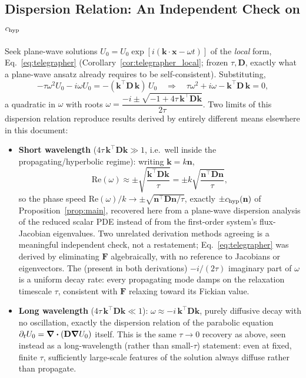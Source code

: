 \documentclass[11pt, a4paper, parskip]{scrartcl}
\theoremstyle{plain}
\theoremstyle{definition}
\theoremstyle{remark}
\newcommand{\Fdiff}{\mathbf{F}}                           %
\newcommand{\nunit}{\mathbf{n}}                           %
\newcommand{\chyp}{c_{\rm hyp}}                           %
\newcommand{\taurelax}{\tau}                              %
\newcommand{\Deff}{\mathbf{D}}                            %
\begin{document}
\subsection{Dispersion Relation: An Independent Check on $\chyp$}
Seek plane-wave solutions $U_0=\hat U_0\exp[i(\mathbf k\cdot\mathbf x-\omega t)]$
of the \emph{local} form, Eq.~\eqref{eq:telegrapher}
(Corollary~\ref{cor:telegrapher_local}; frozen $\taurelax,\Deff$, exactly
what a plane-wave ansatz already requires to be self-consistent).
Substituting,
\begin{equation}
  -\taurelax\omega^2 U_0 - i\omega U_0 = -(\mathbf k^{\!\top}\Deff\,\mathbf k)\,U_0
  \quad\Longrightarrow\quad
  \taurelax\omega^2 + i\omega - \mathbf k^{\!\top}\Deff\,\mathbf k = 0 ,
\end{equation}
a quadratic in $\omega$ with roots
$\omega = \dfrac{-i \pm \sqrt{-1+4\taurelax\,\mathbf k^{\!\top}\Deff\mathbf k}}{2\taurelax}$.
Two limits of this dispersion relation reproduce results derived by
entirely different means elsewhere in this document:
\begin{itemize}
\item \textbf{Short wavelength} ($4\taurelax\,\mathbf k^{\!\top}\Deff\mathbf k\gg1$,
  i.e.\ well inside the propagating/hyperbolic regime): writing
  $\mathbf k=k\nunit$,
  \begin{equation}
    \mathrm{Re}(\omega) \approx \pm\sqrt{\frac{\mathbf k^{\!\top}\Deff\mathbf k}{\taurelax}}
    = \pm k\sqrt{\frac{\nunit^{\!\top}\Deff\nunit}{\taurelax}} ,
  \end{equation}
  so the phase speed $\mathrm{Re}(\omega)/k \to \pm\sqrt{\nunit^{\!\top}\Deff\nunit/\taurelax}$,
  exactly $\pm\chyp(\nunit)$ of Proposition~\ref{prop:main}, recovered
  here from a plane-wave dispersion analysis of the reduced scalar PDE
  instead of from the first-order system's flux-Jacobian eigenvalues. Two
  unrelated derivation methods agreeing is a meaningful independent check,
  not a restatement; Eq.~\eqref{eq:telegrapher} was derived by
  eliminating $\Fdiff$ algebraically, with no reference to Jacobians or
  eigenvectors. The (present in both derivations) $-i/(2\taurelax)$
  imaginary part of $\omega$ is a uniform decay rate: every propagating
  mode damps on the relaxation timescale $\taurelax$, consistent with
  $\Fdiff$ relaxing toward its Fickian value.
\item \textbf{Long wavelength} ($4\taurelax\,\mathbf k^{\!\top}\Deff\mathbf k\ll1$):
  $\omega\approx-i\,\mathbf k^{\!\top}\Deff\mathbf k$, purely diffusive
  decay with no oscillation, exactly the dispersion relation of the
  parabolic equation $\partial_tU_0=\div(\Deff\grad U_0)$ itself. This is
  the same $\taurelax\to0$ recovery as above, seen instead as a
  long-wavelength (rather than small-$\taurelax$) statement: even at
  fixed, finite $\taurelax$, sufficiently large-scale features of the
  solution always diffuse rather than propagate.
\end{itemize}
\end{document}

